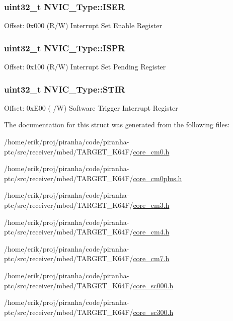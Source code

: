 \subsubsection[{\texorpdfstring{I\+S\+ER}{ISER}}]{ uint32\+\_\+t N\+V\+I\+C\+\_\+\+Type\+::\+I\+S\+ER}\hypertarget{structNVIC__Type_aaff305f50a7117272e5523ec17cff9ec}{}\label{structNVIC__Type_aaff305f50a7117272e5523ec17cff9ec}
Offset\+: 0x000 (R/W) Interrupt Set Enable Register 
\subsubsection[{\texorpdfstring{I\+S\+PR}{ISPR}}]{ uint32\+\_\+t N\+V\+I\+C\+\_\+\+Type\+::\+I\+S\+PR}\hypertarget{structNVIC__Type_aa98673f8401e00b2dc73003a4d747e0b}{}\label{structNVIC__Type_aa98673f8401e00b2dc73003a4d747e0b}
Offset\+: 0x100 (R/W) Interrupt Set Pending Register 
\subsubsection[{\texorpdfstring{S\+T\+IR}{STIR}}]{ uint32\+\_\+t N\+V\+I\+C\+\_\+\+Type\+::\+S\+T\+IR}\hypertarget{structNVIC__Type_a0b0d7f3131da89c659a2580249432749}{}\label{structNVIC__Type_a0b0d7f3131da89c659a2580249432749}
Offset\+: 0x\+E00 ( /W) Software Trigger Interrupt Register 

The documentation for this struct was generated from the following files\+:\begin{DoxyCompactItemize}
\item 
/home/erik/proj/piranha/code/piranha-\/ptc/src/receiver/mbed/\+T\+A\+R\+G\+E\+T\+\_\+\+K64\+F/\hyperlink{core__cm0_8h}{core\+\_\+cm0.\+h}\item 
/home/erik/proj/piranha/code/piranha-\/ptc/src/receiver/mbed/\+T\+A\+R\+G\+E\+T\+\_\+\+K64\+F/\hyperlink{core__cm0plus_8h}{core\+\_\+cm0plus.\+h}\item 
/home/erik/proj/piranha/code/piranha-\/ptc/src/receiver/mbed/\+T\+A\+R\+G\+E\+T\+\_\+\+K64\+F/\hyperlink{core__cm3_8h}{core\+\_\+cm3.\+h}\item 
/home/erik/proj/piranha/code/piranha-\/ptc/src/receiver/mbed/\+T\+A\+R\+G\+E\+T\+\_\+\+K64\+F/\hyperlink{core__cm4_8h}{core\+\_\+cm4.\+h}\item 
/home/erik/proj/piranha/code/piranha-\/ptc/src/receiver/mbed/\+T\+A\+R\+G\+E\+T\+\_\+\+K64\+F/\hyperlink{core__cm7_8h}{core\+\_\+cm7.\+h}\item 
/home/erik/proj/piranha/code/piranha-\/ptc/src/receiver/mbed/\+T\+A\+R\+G\+E\+T\+\_\+\+K64\+F/\hyperlink{core__sc000_8h}{core\+\_\+sc000.\+h}\item 
/home/erik/proj/piranha/code/piranha-\/ptc/src/receiver/mbed/\+T\+A\+R\+G\+E\+T\+\_\+\+K64\+F/\hyperlink{core__sc300_8h}{core\+\_\+sc300.\+h}\end{DoxyCompactItemize}
